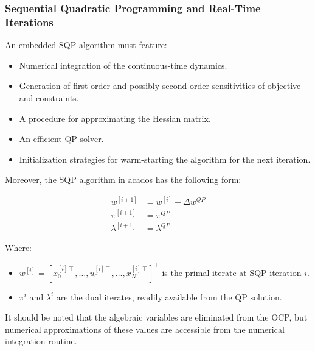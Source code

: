 \documentclass{thesisreport}
\begin{document}
\newpage

\subsubsection{Sequential Quadratic Programming and Real-Time Iterations}

    An embedded SQP algorithm must feature: 
    \begin{itemize}
        \item Numerical integration of the continuous-time dynamics.
        \item Generation of first-order and possibly second-order sensitivities of objective and constraints.
        \item A procedure for approximating the Hessian matrix.
        \item An efficient QP solver.
        \item Initialization strategies for warm-starting the algorithm for the next iteration.
    \end{itemize}

Moreover, the SQP algorithm in acados has the following form:

\begin{align}
	 w^{[i+1]} &=w^{[i]} + \Delta w^{QP}\\
     \pi^{[i+1]} &= \pi^{QP} \\
     \lambda^{[i+1]} &= \lambda^{QP}
\end{align}


Where:
\begin{itemize}
    \item $ w^{[i]} = [x_0^{[i] \intercal}, \ldots, u_0^{[i] \intercal}, \ldots, x_N^{[i] \intercal}]^{\intercal}$ is the primal iterate at SQP iteration $i$.
    \item $\pi^i$ and $\lambda^i$ are the dual iterates, readily available from the QP solution.
\end{itemize}

It should be noted that the algebraic variables are eliminated from the OCP, but numerical approximations of these values are accessible from the numerical integration routine.
\end{document}
